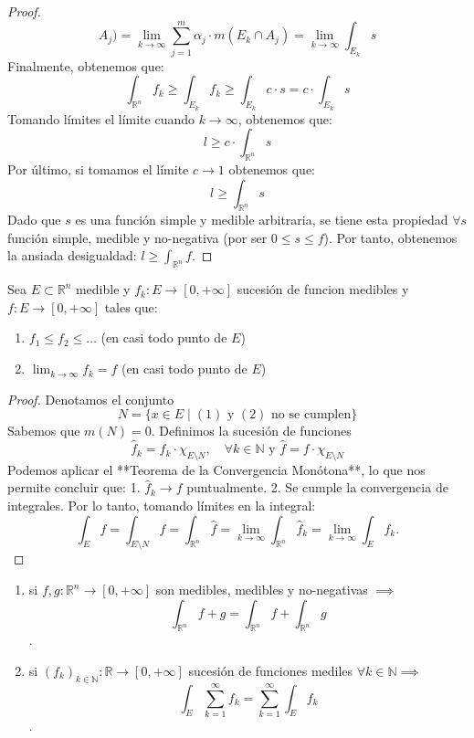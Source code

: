 \begin{proof}
$$        A_j) = \lim\limits_{k \to \infty} \sum_{j=1}^{m} \alpha_j \cdot m(E_k \cap A_j)
        = \lim\limits_{k \to \infty} \int_{E_k} s$$ Finalmente, obtenemos que: $$
        \int_{\mathbb{R}^n}f_k \geq \int_{E_k} f_k \geq \int_{E_k} c \cdot s = c \cdot
        \int_{E_k} s$$ Tomando límites el límite cuando $k \to \infty$, obtenemos que:
    $$ l \geq c \cdot \int_{\mathbb{R}^n} s$$ Por último, si tomamos el límite $c
        \to 1$ obtenemos que: $$ l \geq \int_{\mathbb{R}^n} s$$ Dado que $s$ es una
    función simple y medible arbitraria, se tiene esta propiedad $\forall s$
    función simple, medible y no-negativa (por ser $0 \leq s \leq f$). Por tanto,
    obtenemos la ansiada desigualdad: $l \geq \int_{\mathbb{R}^n} f$.
\end{proof}
\begin{teorema}
    Sea $E \subset \mathbb{R}^n$ medible y $f_k: E \to [0, +\infty]$ sucesión de funcion medibles y $f: E \to [0, +\infty]$ tales que:
    \begin{enumerate}
        \item $f_1 \leq f_2 \leq \dots$ (en casi todo punto de $E$)
        \item $\lim_{k \to \infty}f_k = f$ (en casi todo punto de $E$)
    \end{enumerate}
\end{teorema}
\begin{proof}
    Denotamos el conjunto $$ N = \{ x \in E \mid (1) \text{ y } (2) \text{ no se cumplen} \} $$
    Sabemos que \( m(N) = 0 \). Definimos la sucesión de funciones $$ \hat{f}_k = f_k \cdot \chi_{E \setminus  N}, \quad \forall k \in \mathbb{N} \text{ y } \hat{f} = f \cdot \chi_{E\setminus N}$$
    Podemos aplicar el **Teorema de la Convergencia Monótona**, lo que nos permite concluir que:
    1. \( \hat{f}_k \to f \) puntualmente.
    2. Se cumple la convergencia de integrales.
    Por lo tanto, tomando límites en la integral:
    $$ \int_E f = \int_{E \setminus N} f = \int_{\mathbb{R}^n}\hat{f} = \lim_{k \to \infty} \int_{\mathbb{R}^n} \hat{f}_k = \lim_{k \to \infty} \int_E f_k. $$
\end{proof}
\begin{corolario}
    \begin{enumerate}
        \item si $f, g: \mathbb{R}^n \to [0, +\infty]$ son medibles, medibles y no-negativas
              $\implies$ $$\int_{\mathbb{R}^n}f+g = \int_{\mathbb{R}^n}f +
                  \int_{\mathbb{R}^n}g$$.
        \item si $(f_k)_{k\in \mathbb{N}}: \mathbb{R} \to [0, +\infty]$ sucesión de funciones
              mediles $\forall k \in \mathbb{N} \implies$ $$\int_{E}\sum_{k=1}^{\infty}f_k =
                  \sum_{k=1}^{\infty}\int_{E}f_k$$.
    \end{enumerate}
\end{corolario}

